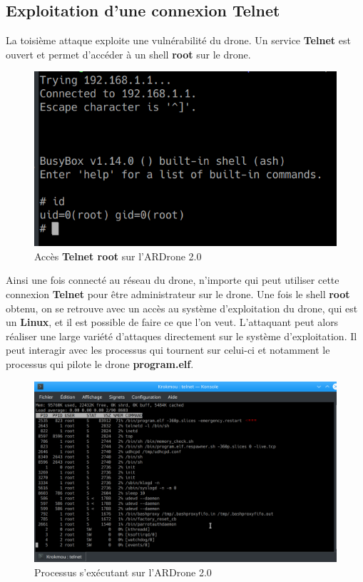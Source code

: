 \subsection{Exploitation d'une connexion Telnet}
La toisième attaque exploite une vulnérabilité du drone. Un service \textbf{Telnet} est ouvert et permet d'accéder à un shell \textbf{root} sur le drone.

\begin{figure}[H]
  \centering
  \includegraphics[scale=0.7]{images/root.png}
  \caption{Accès \textbf{Telnet root} sur l'ARDrone 2.0}
\end{figure}

Ainsi une fois connecté au réseau du drone, n'importe qui peut utiliser cette connexion \textbf{Telnet} pour être administrateur sur le drone. Une fois le shell \textbf{root} obtenu, on se retrouve avec un accès au système d'exploitation du drone, qui est un \textbf{Linux}, et il est possible de faire ce que l'on veut. L'attaquant peut alors réaliser une large variété d'attaques directement sur le système d'exploitation. Il peut interagir avec les processus qui tournent sur celui-ci et notamment le processus qui pilote le drone \textbf{program.elf}.

\begin{figure}[H]
  \centering
  \includegraphics[scale=0.35]{images/processus.png}
  \caption{Processus s'exécutant sur l'ARDrone 2.0}
\end{figure}

